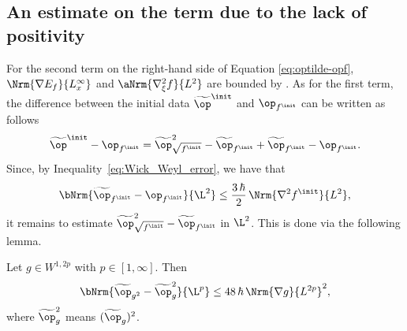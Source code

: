 \subsection{An estimate on the term due to the lack of positivity}

For the second term on the right-hand side of Equation \eqref{eq:optilde-opf}, $\Nrm{\nabla E_f}{L^\infty_x}$ and $\aNrm{\nabla^2_\xi f}{L^2}$ are bounded by \cite[Prop.\,A.1]{lafleche_strong_2021}. As for the first term, the difference between the initial data $\widetilde{\op}^\init$ and $\op_{f^\init}$ can be written as follows
\begin{equation*}
\widetilde{\op}^\init - \op_{f^\init} = \widetilde{\op}_{\sqrt{f^\init}}^2 - \widetilde{\op}_{f^\init} + \widetilde{\op}_{f^\init} - \op_{f^\init}.
\end{equation*}
Since, by Inequality~\eqref{eq:Wick_Weyl_error}, we have that
\begin{equation}\label{eq:Wick_Weyl_error_init}
\bNrm{\widetilde{\op}_{f^\init} - \op_{f^\init}}{\L^2} \leq \frac{3\,\hbar}{2}\, {\Nrm{\nabla^2 f^\init}{L^2}},
\end{equation}
it remains to estimate $\widetilde{\op}_{\sqrt{f^\init}}^2 - \widetilde{\op}_{f^\init}$ in $\L^2$. This is done via the following lemma.

\begin{lem}\label{lem:commut_square_wick}
{Let $g\in W^{1,2p}$ with $p\in[1,\infty]$.} Then
\begin{equation*}
\bNrm{\widetilde{\op}_{g^2} - \widetilde{\op}_g^2}{\L^p} \leq 48\,\hbar\, {\Nrm{\nabla g}{L^{2p}}^2},
\end{equation*}
where $\widetilde{\op}_g^2$ means $(\widetilde{\op}_g)^2$.
\end{lem}

